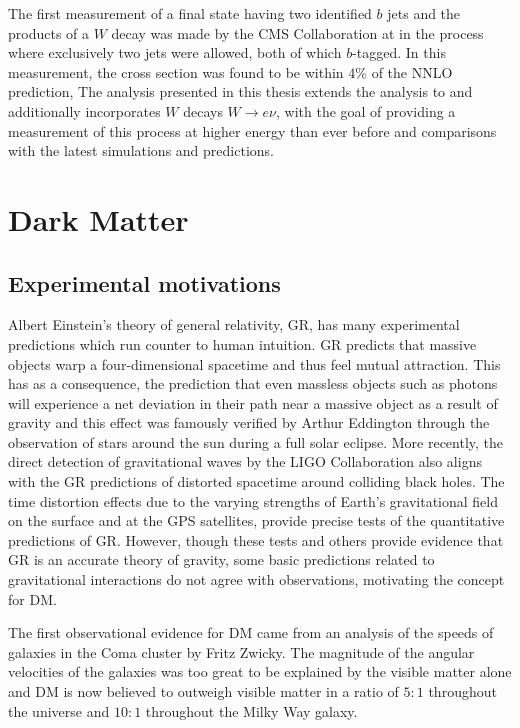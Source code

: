 The first measurement of a final state
 having two identified $b$ jets
 and the products of a $W$ decay
 was made by the CMS Collaboration 
 at  \TeV
 in the process \ppwbbmnbb where 
 exclusively two jets were allowed,
 both of which $b$-tagged.
In this measurement, the 
 cross section was found to be  
 within $4\%$ of the NNLO prediction,
The analysis presented in this
 thesis extends the \ppwbbmnbb analysis
 to  \TeV and additionally incorporates $W$
 decays $W\rightarrow e\nu$,
 with the goal of providing a
 measurement of this process at higher
 energy than ever before and comparisons
 with the latest simulations and predictions.

\section{Dark Matter}

 \subsection{Experimental motivations}
  
 Albert Einstein's theory of general relativity, GR,
  has many experimental predictions which 
  run counter to human intuition.
 GR predicts that massive objects
  warp a four-dimensional spacetime and
  thus feel mutual attraction.
 This has as a consequence,
  the prediction that even massless objects
  such as photons will experience a 
  net deviation in their path
  near a massive object as a result of
  gravity and this effect was famously verified
  by Arthur Eddington
  through the observation of stars around the
  sun during a full solar eclipse. 
 More recently, the direct detection of
  gravitational waves by the LIGO
  Collaboration also aligns with the GR
  predictions of distorted spacetime
  around colliding black holes.
 The time distortion effects due to
  the varying strengths of Earth's gravitational
  field on the surface and at the GPS satellites,
  provide precise tests of the quantitative 
  predictions of GR.
 However, though these tests and others provide evidence that
  GR is an accurate theory of gravity,
  some basic predictions related to gravitational interactions 
  do not agree with observations,
  motivating the concept for DM.
  
 The first observational evidence for DM
  came from an analysis of the speeds of galaxies
  in the Coma cluster by Fritz Zwicky.
 The magnitude of the angular velocities of the
  galaxies was too great to be explained by the visible matter
  alone and DM is now believed to outweigh visible
  matter in a ratio of $5:1$ throughout the universe
  and $10:1$ throughout the Milky Way galaxy. 


